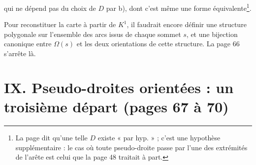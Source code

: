 \documentclass[11pt,a4paper]{article}
\begin{document}

qui ne dépend pas du choix de $D$ par b), dont c'est même une forme
équivalente\footnote{La page dit qu'une telle $D$ existe « par hyp. » ; c'est
une hypothèse supplémentaire : le cas où toute pseudo-droite passe par l'une
des extrémités de l'arête est celui que la page 48 traitait à part.}.

Pour reconstituer la carte à partir de $K^1$, il faudrait encore définir une
structure polygonale sur l'ensemble des arcs issus de chaque sommet $s$, et
une bijection canonique entre $\Omega(s)$ et les deux orientations de cette
structure. La page 66 s'arrête là.

\section*{IX. Pseudo-droites orientées : un troisième départ (pages 67 à 70)}
\end{document}
